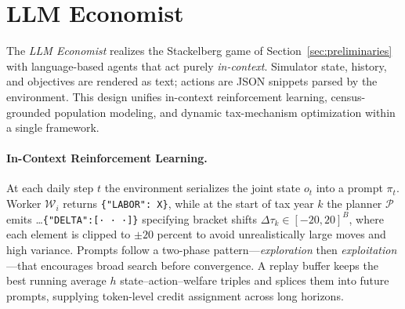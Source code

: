 \section{LLM Economist}
\label{sec:llm_economist}

The \textit{LLM Economist} realizes the Stackelberg game of Section~\ref{sec:preliminaries} with language-based agents that act purely \emph{in-context}.  Simulator state, history, and objectives are rendered as text; actions are JSON snippets parsed by the environment.  This design unifies in-context reinforcement learning, census-grounded population modeling, and dynamic tax-mechanism optimization within a single framework.

\paragraph{In-Context Reinforcement Learning.}
At each daily step \(t\) the environment serializes the joint state \(o_t\) into a prompt \(\pi_t\).  Worker \(\mathcal{W}_i\) returns \verb|{"LABOR": X}|, while at the start of tax year \(k\) the planner \(\mathcal{P}\) emits \ldots\verb|{"DELTA":[· · ·]}| specifying bracket shifts $\Delta\tau_k\in[-20,20]^B$, where each element is clipped to $\pm20$ percent to avoid unrealistically large moves and high variance. 
Prompts follow a two-phase pattern—\emph{exploration} then \emph{exploitation}—that encourages broad search before convergence.  A replay buffer keeps the best running average \(h\) state–action–welfare triples and splices them into future prompts, supplying token-level credit assignment across long horizons.

